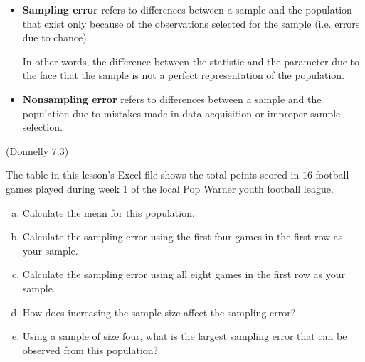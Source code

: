 \documentclass[12pt, letterpaper]{article}
\newcounter{exercise}
\theoremstyle{definition}
\begin{document}
\begin{itemize}

\item \textbf{Sampling error} refers to differences between a sample and the population that exist only because of the observations selected for the sample (i.e. errors due to chance).  

In other words, the difference between the statistic and the parameter due to the face that the sample is not a perfect representation of the population.

\vfill

\item \textbf{Nonsampling error} refers to differences between a sample and the population due to mistakes made in data acquisition or improper sample selection.

\vfill

\end{itemize}

\newpage

\begin{exercise}  (Donnelly 7.3)

The table in this lesson's Excel file shows the total points scored in $16$ football games played during week 1 of the local Pop Warner youth football league.

\end{exercise}

\begin{enumerate}[(a)]

\item Calculate the mean for this population.

\vfill

\item Calculate the sampling error using the first four games in the first row as your sample.

\vfill

\item Calculate the sampling error using all eight games in the first row as your sample.

\vfill

\item How does increasing the sample size affect the sampling error?

\vfill

\item Using a sample of size four, what is the largest sampling error that can be observed from this population?

\vfill
\vfill

\end{enumerate}
\end{document}
